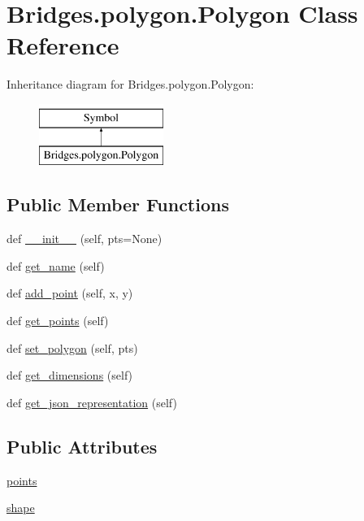 \hypertarget{class_bridges_1_1polygon_1_1_polygon}{}\section{Bridges.\+polygon.\+Polygon Class Reference}
\label{class_bridges_1_1polygon_1_1_polygon}
Inheritance diagram for Bridges.\+polygon.\+Polygon\+:\begin{figure}[H]
\begin{center}
\leavevmode
\includegraphics[height=2.000000cm]{class_bridges_1_1polygon_1_1_polygon}
\end{center}
\end{figure}
\subsection*{Public Member Functions}
\begin{DoxyCompactItemize}
\item 
def \mbox{\hyperlink{class_bridges_1_1polygon_1_1_polygon_a2fae05dc802684b344f111b274ac0c1a}{\+\_\+\+\_\+init\+\_\+\+\_\+}} (self, pts=None)
\item 
def \mbox{\hyperlink{class_bridges_1_1polygon_1_1_polygon_ac9356366dbc901727960f1453ebd5b9c}{get\+\_\+name}} (self)
\item 
def \mbox{\hyperlink{class_bridges_1_1polygon_1_1_polygon_a3c5d0d054fff18224cbd119c140f7992}{add\+\_\+point}} (self, x, y)
\item 
def \mbox{\hyperlink{class_bridges_1_1polygon_1_1_polygon_a2a4f182fb6f20ed0f4d2bef26ff4b856}{get\+\_\+points}} (self)
\item 
def \mbox{\hyperlink{class_bridges_1_1polygon_1_1_polygon_ac38b2fe8562b3419a8f2455cb0135f9b}{set\+\_\+polygon}} (self, pts)
\item 
def \mbox{\hyperlink{class_bridges_1_1polygon_1_1_polygon_a460fd0e58537beedf015ac7c092a6b8d}{get\+\_\+dimensions}} (self)
\item 
def \mbox{\hyperlink{class_bridges_1_1polygon_1_1_polygon_ac3ebc24755030ecad4508d8c89e7df9f}{get\+\_\+json\+\_\+representation}} (self)
\end{DoxyCompactItemize}
\subsection*{Public Attributes}
\begin{DoxyCompactItemize}
\item 
\mbox{\hyperlink{class_bridges_1_1polygon_1_1_polygon_a5303a39545d984b97ead1465ecbf9d1e}{points}}
\item 
\mbox{\hyperlink{class_bridges_1_1polygon_1_1_polygon_a764c8ae70e85104000e869dbcf23ac2c}{shape}}
\end{DoxyCompactItemize}


